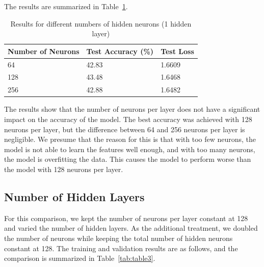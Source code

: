 \documentclass{article}
\begin{document}
    The results are summarized in Table~\ref{tab:table2}.


    \begin{table}[H]
        \centering
        \caption{Results for different numbers of hidden neurons (1 hidden layer)}
        \label{tab:table2}
        \begin{tabular}{l|l|l}
            \toprule
            Number of Neurons & Test Accuracy (\%) & Test Loss \\
            \midrule
            64                & 42.83              & 1.6609    \\
            128               & 43.48              & 1.6468    \\
            256               & 42.88              & 1.6482    \\
            \bottomrule

        \end{tabular}
    \end{table}

    The results show that the number of neurons per layer does not have a significant impact on the accuracy of the model.
    The best accuracy was achieved with 128 neurons per layer, but the difference between 64 and 256 neurons per layer is negligible.
    We presume that the reason for this is that with too few neurons, the model is not able to learn the features well enough,
    and with too many neurons, the model is overfitting the data.
    This causes the model to perform worse than the model with 128 neurons per layer.

    \subsection{Number of Hidden Layers}\label{subsec:number-of-hidden-layers}

    For this comparison, we kept the number of neurons per layer constant at 128 and varied the number of hidden layers.
    As the additional treatment, we doubled the number of neurons while keeping the total number of hidden neurons constant
    at 128.
    The training and validation results are as follows, and the comparison is summarized in Table~\ref{tab:table3}.
\end{document}
